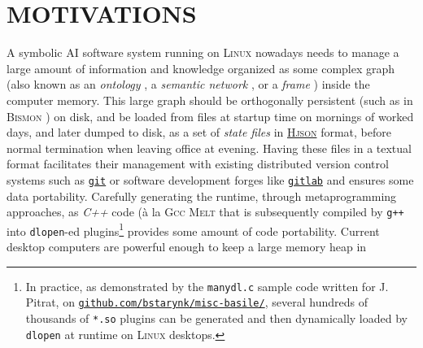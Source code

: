 \documentclass{ecai}
\begin{document}
\medskip

\section{MOTIVATIONS}
\label{sec:motivations}

A symbolic AI software system running on \textsc{Linux} nowadays needs to
manage a large amount of information and knowledge organized as some
complex graph (also known as an \emph{ontology}
\cite{DeNicola:2009:OntologyBuilding}, a \emph{semantic network}
\cite{VanDeRiet:1992:Ling-instr-know}, or a \emph{frame}
\cite{Bobrow-Winograd:1977:KRL, Lenat:1983:theory}) inside the
computer memory. This large graph should be orthogonally persistent
\cite{Dearle:2010:orthopersist} (such as in \textsc{Bismon}
\cite{Starynkevitch:2019:bismon-draft}) on disk, and be loaded from
files at startup time on mornings of worked days, and later dumped to
disk, as a set of \emph{state files} in \href{http://hjson.org/}{\textsc{Hjson}} format, before
normal termination when leaving office at evening. Having these files
in a textual format facilitates their management with existing
distributed version control systems such as
\href{http://git-scm.com}{\texttt{git}} or software development forges
like \href{http://gitlab.com/}{\texttt{gitlab}} and ensures some data
portability. Carefully generating the runtime, through metaprogramming
approaches, as \emph{C++} code (à la \textsc{Gcc Melt}
\cite{Starynkevitch-DSL2011} that is subsequently compiled by
\texttt{g++} into \texttt{dlopen}-ed plugins\footnote{In practice, as
demonstrated by the \texttt{manydl.c} sample code written for J. Pitrat, on
\href{http://github.com/bstarynk/misc-basile/}{\texttt{github.com/bstarynk/misc-basile/}},
several hundreds of thousands of \texttt{*.so} plugins can be
generated and then dynamically loaded by \texttt{dlopen} at runtime on
\textsc{Linux} desktops.} provides some amount of code portability. Current
desktop computers are powerful enough to keep a large memory heap in
\end{document}

